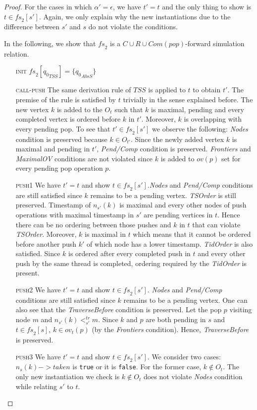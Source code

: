 \begin{proof}
For the cases in which $\alpha' = \epsilon$, we have $t'=t$ and the only thing to show is $t \in \mathit{fs}_2[s']$. Again, we only explain why the new instantiations due to the difference between $s'$ and $s$ do not violate the conditions.

In the following, we show that $\mathit{fs}_2$ is a $C \cup R \cup Com(pop)$-forward simulation relation.
\begin{itemize}
\item[\textsc{init}] $\mathit{fs}_2[{q_0}_{TSS}] =\{{q_0}_{AbsS}\}$
\item[\textsc{call-push}] The same derivation rule of $TSS$ is applied to $t$  to obtain $t'$. The premise of the rule is satisfied by $t$ trivially in the sense explained before. The new vertex $k$ is added to the $O_t$ such that $k$ is maximal, pending and every completed vertex is ordered before $k$ in $t'$. Moreover, $k$ is overlapping with every pending pop. To see that $t' \in \mathit{fs}_2[s']$ we observe the following: \emph{Nodes} condition is preserved because $k \in O_{t'}$. Since the newly added vertex $k$ is maximal and pending in $t'$, \emph{Pend/Comp} condition is preserved. \emph{Frontiers} and \emph{MaximalOV} conditions are not violated since $k$ is added to $ov(p)$ set for every pending pop operation $p$. 
\item[\textsc{push1}] We have $t' = t$ and show $t \in \mathit{fs}_2[s']$.\emph{Nodes} and \emph{Pend/Comp} conditions are still satisfied since $k$ remains to be a pending vertex. \emph{TSOrder} is still preserved. Timestamp of $n_{s'}(k)$ is maximal and every other nodes of push operations with maximal timestamp in $s'$ are pending vertices in $t$. Hence there can be no ordering between those pushes and $k$ in $t$ that can violate \emph{TSOrder}. Moreover, $k$ is maximal in $t$ which means that it cannot be ordered before another push $k'$ of which node has a lower timestamp. \emph{TidOrder} is also satisfied. Since $k$ is ordered after every completed push in $t$ and every other push by the same thread is completed, ordering required by the \emph{TidOrder} is present.
\item[\textsc{push2}] We have $t' = t$ and show $t \in \mathit{fs}_2[s']$. \emph{Nodes} and \emph{Pend/Comp} conditions are still satisfied since $k$ remains to be a pending vertex. One can also see that the \emph{TraverseBefore} condition is preserved. Let the pop $p$ visiting node $m$ and $n_{s'}(k) <^{tr}_{s'} m$. Since $k$ and $p$ are both pending in $s$ and $t \in \mathit{fs}_2[s]$, $k \in ov_t(p)$ (by the \emph{Frontiers} condition). Hence, \emph{TraverseBefore} is preserved. 
\item[\textsc{push3}] We have $t' = t$ and show $t \in \mathit{fs}_2[s']$. We consider two cases: $n_s(k)->taken$ is \texttt{true} or it is \texttt{false}. For the former case, $k \notin O_t$. The only new instantiation we check is $k \notin O_t$ does not violate \emph{Nodes} condition while relating $s'$ to $t$. 


\end{itemize}
\end{proof}
